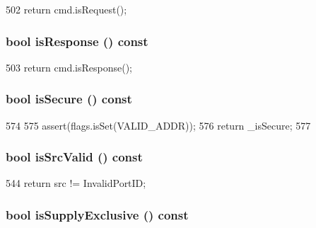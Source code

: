 \begin{DoxyCode}
502 { return cmd.isRequest(); }
\end{DoxyCode}
\hypertarget{classPacket_a5f89a108755a6cb3e8185d85c850a816}{
\subsubsection[{isResponse}]{\setlength{\rightskip}{0pt plus 5cm}bool isResponse () const}}
\label{classPacket_a5f89a108755a6cb3e8185d85c850a816}



\begin{DoxyCode}
503 { return cmd.isResponse(); }
\end{DoxyCode}
\hypertarget{classPacket_a3110ebf17828782ae5aeced7396cfff2}{
\subsubsection[{isSecure}]{\setlength{\rightskip}{0pt plus 5cm}bool isSecure () const}}
\label{classPacket_a3110ebf17828782ae5aeced7396cfff2}



\begin{DoxyCode}
574     {
575         assert(flags.isSet(VALID_ADDR));
576         return _isSecure;
577     }
\end{DoxyCode}
\hypertarget{classPacket_a298fc6cc50f34dc7eaee82b746129eb3}{
\subsubsection[{isSrcValid}]{\setlength{\rightskip}{0pt plus 5cm}bool isSrcValid () const}}
\label{classPacket_a298fc6cc50f34dc7eaee82b746129eb3}



\begin{DoxyCode}
544 { return src != InvalidPortID; }
\end{DoxyCode}
\hypertarget{classPacket_ae74f555f87001a9695338ce38a6ce8ee}{
\subsubsection[{isSupplyExclusive}]{\setlength{\rightskip}{0pt plus 5cm}bool isSupplyExclusive () const}}
\label{classPacket_ae74f555f87001a9695338ce38a6ce8ee}



